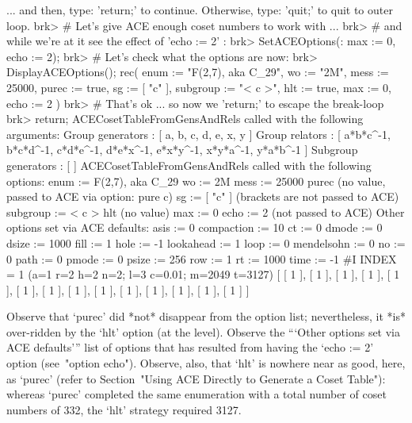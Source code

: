  ... and then, type: 'return;' to continue.
 Otherwise, type: 'quit;' to quit to outer loop.
brk> # Let's give ACE enough coset numbers to work with ...                    
brk> # and while we're at it see the effect of 'echo := 2' :                   
brk> SetACEOptions(: max := 0, echo := 2);                                     
brk> # Let's check what the options are now:                                   
brk> DisplayACEOptions();                                                      
rec(
  enum := "F(2,7), aka C_29",
  wo := "2M",
  mess := 25000,
  purec := true,
  sg := [ "c" ],
  subgroup := "< c >",
  hlt := true,
  max := 0,
  echo := 2 )
brk> # That's ok ... so now we 'return;' to escape the break-loop              
brk> return;                                                                   
ACECosetTableFromGensAndRels called with the following arguments:
 Group generators : [ a, b, c, d, e, x, y ]
 Group relators : [ a*b*c^-1, b*c*d^-1, c*d*e^-1, d*e*x^-1, e*x*y^-1, 
  x*y*a^-1, y*a*b^-1 ]
 Subgroup generators : [  ]
ACECosetTableFromGensAndRels called with the following options:
 enum := F(2,7), aka C_29
 wo := 2M
 mess := 25000
 purec (no value, passed to ACE via option: pure c)
 sg := [ "c" ] (brackets are not passed to ACE)
 subgroup := < c >
 hlt (no value)
 max := 0
 echo := 2 (not passed to ACE)
Other options set via ACE defaults:
 asis := 0
 compaction := 10
 ct := 0
 dmode := 0
 dsize := 1000
 fill := 1
 hole := -1
 lookahead := 1
 loop := 0
 mendelsohn := 0
 no := 0
 path := 0
 pmode := 0
 psize := 256
 row := 1
 rt := 1000
 time := -1
#I  INDEX = 1 (a=1 r=2 h=2 n=2; l=3 c=0.01; m=2049 t=3127)
[ [ 1 ], [ 1 ], [ 1 ], [ 1 ], [ 1 ], [ 1 ], [ 1 ], [ 1 ], [ 1 ], [ 1 ], 
  [ 1 ], [ 1 ], [ 1 ], [ 1 ] ]
\endexample

Observe that  `purec'  did  *not*  disappear  from  the  option  list;
nevertheless, it *is* over-ridden by the `hlt' option (at  the  {\ACE}
level). Observe the  ```Other options set via ACE defaults''' list  of
options  that  has  resulted  from  having  the  `echo  :=  2'  option
(see~"option echo"). Observe, also, that  `hlt'  is  nowhere  near  as
good, here, as  `purec'  (refer  to  Section~"Using  ACE  Directly  to
Generate  a  Coset  Table"):  whereas  `purec'  completed   the   same
enumeration with a total number of coset numbers  of  332,  the  `hlt'
strategy required 3127.

